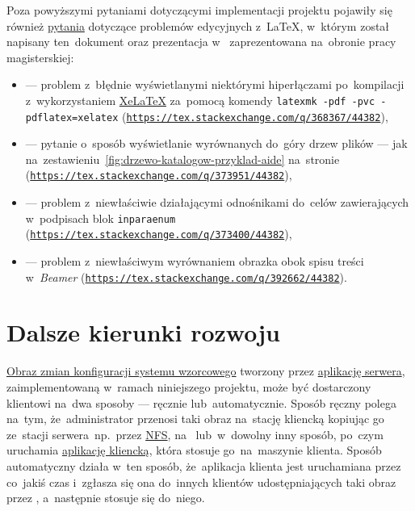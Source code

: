 \documentclass[thesis]{subfiles}
\begin{document}
Poza powyższymi pytaniami dotyczącymi implementacji projektu pojawiły się również \href{https://tex.stackexchange.com/q/373400/44382}{pytania} dotyczące problemów edycyjnych z~\LaTeX, w~którym został napisany ten~dokument oraz prezentacja w~ zaprezentowana na~obronie pracy magisterskiej:
\begin{itemize}
	\item {} --- problem z~błędnie wyświetlanymi niektórymi hiperłączami po~kompilacji z~wykorzystaniem \href{https://www.sharelatex.com/learn/XeLaTeX}{XeLaTeX} za~pomocą komendy \texttt{latexmk -pdf -pvc -pdflatex=xelatex} (\texttt{\url{https://tex.stackexchange.com/q/368367/44382}}),
	\item {} --- pytanie o~sposób wyświetlanie wyrównanych do~góry drzew plików --- jak na~zestawieniu~\ref{fig:drzewo-katalogow-przyklad-aide} na~stronie~\pageref{fig:drzewo-katalogow-przyklad-aide} (\texttt{\url{https://tex.stackexchange.com/q/373951/44382}}),
	\item {} --- problem z~niewłaściwie działającymi odnośnikami do~celów zawierających w~podpisach blok \texttt{inparaenum} (\texttt{\url{https://tex.stackexchange.com/q/373400/44382}}),
	\item {} --- problem z~niewłaściwym wyrównaniem obrazka obok spisu treści w~\emph{Beamer} (\texttt{\url{https://tex.stackexchange.com/q/392662/44382}}).
\end{itemize}


\section{Dalsze kierunki rozwoju}

\hyperref[sec:obraz-zmian-konfiguracji]{Obraz zmian konfiguracji systemu wzorcowego} tworzony przez \hyperref[sec:srv-app]{aplikację serwera}, zaimplementowaną w~ramach niniejszego projektu, może być dostarczony klientowi na~dwa sposoby --- ręcznie lub~automatycznie. Sposób ręczny polega na~tym, że~administrator przenosi taki obraz na~stację kliencką kopiując go ze~stacji serwera~np.~przez \href{https://en.wikipedia.org/wiki/Network_File_System}{NFS}, na~ lub~w~dowolny inny sposób, po~czym uruchamia \hyperref[sec:cli-app]{aplikację kliencką}, która stosuje go~na~maszynie klienta. Sposób automatyczny działa w~ten sposób, że~aplikacja klienta jest uruchamiana przez  co~jakiś czas i~zgłasza się ona do~innych klientów udostępniających taki obraz przez \sftp{}, a~następnie stosuje się do~niego.
\end{document}
